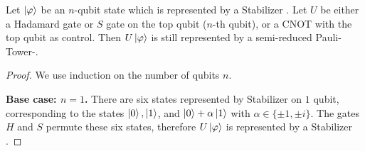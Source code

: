 \begin{lemma}
    \label{lemma:clifford-tower}
    Let $\ket{\varphi}$ be an $n$-qubit state which is represented by a Stabilizer \limdd.
    Let $U$ be either a Hadamard gate or $S$ gate on the top qubit ($n$-th qubit), or a CNOT with the top qubit as control.
    Then $U\ket{\varphi}$ is still represented by a semi-reduced Pauli-Tower-\limdd.
\end{lemma}
\begin{proof}
    We use induction on the number of qubits $n$.
    
    \textbf{Base case: $n=1$.}
    There are six states represented by Stabilizer \limdds on $1$ qubit, corresponding to the states $\ket{0},\ket{1}$, and $\ket{0} + \alpha\ket 1$ with $\alpha\in \{\pm 1,\pm i\}$.
    The gates $H$ and $S$ permute these six states, therefore $U\ket {\varphi}$ is represented by a Stabilizer \limdd.
    

\end{proof}
